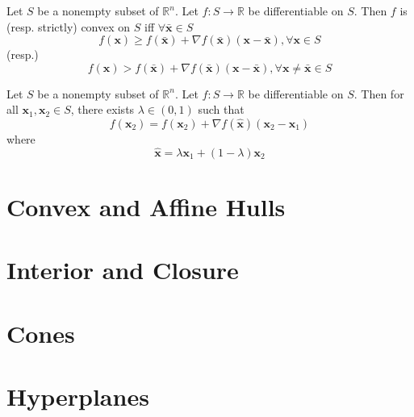 				\begin{theorem}
					Let $S$ be a nonempty subset of $\mathbb{R}^n$. Let $f: S\rightarrow \mathbb{R}$ be differentiable on $S$. Then $f$ is (resp. strictly) convex on $S$ iff $\forall \bar{\mathbf{x}} \in S$
					\begin{equation}
						f(\mathbf{x}) \ge f(\bar{\mathbf{x}}) + \nabla f(\bar{\mathbf{x}}) (\mathbf{x} - \bar{\mathbf{x}}), \forall \mathbf{x} \in S
					\end{equation}
					(resp.)
					\begin{equation}
						f(\mathbf{x}) > f(\bar{\mathbf{x}}) + \nabla f(\bar{\mathbf{x}}) (\mathbf{x} - \bar{\mathbf{x}}), \forall \mathbf{x}\neq \bar{\mathbf{x}} \in S
					\end{equation}
				\end{theorem}

				\begin{theorem}
					Let $S$ be a nonempty subset of $\mathbb{R}^n$. Let $f: S\rightarrow \mathbb{R}$ be differentiable on $S$. Then for all $\mathbf{x}_1, \mathbf{x}_2 \in S$, there exists $\lambda \in (0, 1)$ such that
					\begin{equation}
						f(\mathbf{x}_2) = f(\mathbf{x}_2) + \nabla f(\hat{\mathbf{x}})(\mathbf{x}_2 - \mathbf{x}_1)
					\end{equation}
					where
					\begin{equation}
						\hat{\mathbf{x}} = \lambda \mathbf{x}_1 + (1 - \lambda) \mathbf{x}_2
					\end{equation}
				\end{theorem}

			\section{Convex and Affine Hulls}

			\section{Interior and Closure}

			\section{Cones}

			\section{Hyperplanes}

